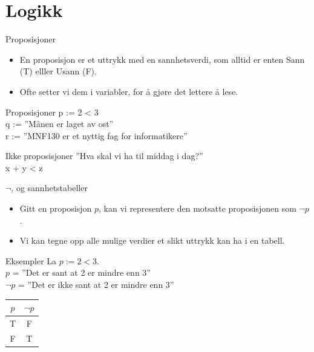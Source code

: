 
\section{Logikk}
\begin{frame}{Proposisjoner}
\begin{itemize}
    \item En proposisjon er et uttrykk med en sannhetsverdi, som alltid er enten Sann (T) elller Usann (F).
    \item Ofte setter vi dem i variabler, for å gjøre det lettere å lese.
\end{itemize}
\pause
\begin{block}{Proposisjoner}
    p := 2 < 3 \\
    q := ''Månen er laget av ost''\\
    r := ''MNF130 er et nyttig fag for informatikere''
\end{block}
\pause
\begin{block}{Ikke proposisjoner}
    ''Hva skal vi ha til middag i dag?''\\
    x + y < z
\end{block}
\end{frame}

\begin{frame}{$\lnot$, og sannhetstabeller}
\begin{itemize}
    \item Gitt en proposisjon $p$, kan vi representere den motsatte proposisjonen som $\lnot p$.
    \item Vi kan tegne opp alle mulige verdier et slikt uttrykk kan ha i en tabell.
\end{itemize}
\pause

\begin{block}{Eksempler}
    La $p := 2 < 3$. \\
    $p$ = ''Det er sant at 2 er mindre enn 3'' \\
    $\lnot p$ = ''Det er ikke sant at 2 er mindre enn 3''
\end{block}
\pause
\begin{tabular}{c|c}
$p$ & $\lnot p$ \\ \hline
T & F \\
F & T \\ \hline
\end{tabular}
\end{frame}

